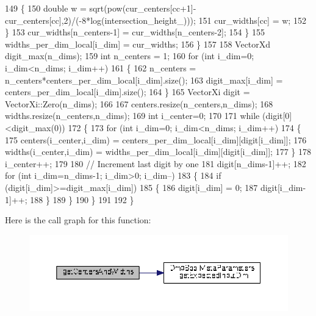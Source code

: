 \begin{DoxyCode}
149       \{
150         \textcolor{keywordtype}{double} w = sqrt(pow(cur\_centers[cc+1]-cur\_centers[cc],2)/(-8*log(intersection\_height\_)));
151         cur\_widths[cc] = w;
152       \}
153       cur\_widths[n\_centers-1] = cur\_widths[n\_centers-2];
154     \}
155     widths\_per\_dim\_local[i\_dim] = cur\_widths;
156   \}
157 
158   VectorXd digit\_max(n\_dims);
159   \textcolor{keywordtype}{int} n\_centers = 1;
160   \textcolor{keywordflow}{for} (\textcolor{keywordtype}{int} i\_dim=0; i\_dim<n\_dims; i\_dim++)
161   \{
162     n\_centers = n\_centers*centers\_per\_dim\_local[i\_dim].size();
163     digit\_max[i\_dim] = centers\_per\_dim\_local[i\_dim].size();
164   \}
165   VectorXi digit = VectorXi::Zero(n\_dims);
166   
167   centers.resize(n\_centers,n\_dims);
168   widths.resize(n\_centers,n\_dims);
169   \textcolor{keywordtype}{int} i\_center=0;
170 
171   \textcolor{keywordflow}{while} (digit[0]<digit\_max(0))
172   \{
173     \textcolor{keywordflow}{for} (\textcolor{keywordtype}{int} i\_dim=0; i\_dim<n\_dims; i\_dim++)
174     \{
175       centers(i\_center,i\_dim) = centers\_per\_dim\_local[i\_dim][digit[i\_dim]];
176       widths(i\_center,i\_dim) = widths\_per\_dim\_local[i\_dim][digit[i\_dim]];
177     \}
178     i\_center++;
179   
180     \textcolor{comment}{// Increment last digit by one}
181     digit[n\_dims-1]++;
182     \textcolor{keywordflow}{for} (\textcolor{keywordtype}{int} i\_dim=n\_dims-1; i\_dim>0; i\_dim--)
183     \{
184       \textcolor{keywordflow}{if} (digit[i\_dim]>=digit\_max[i\_dim])
185       \{
186         digit[i\_dim] = 0;
187         digit[i\_dim-1]++;
188       \}
189     \}
190   \}
191   
192 \}
\end{DoxyCode}


Here is the call graph for this function\+:
\nopagebreak
\begin{figure}[H]
\begin{center}
\leavevmode
\includegraphics[width=350pt]{classDmpBbo_1_1MetaParametersLWR_ab4dfc7a149e6637cb3e610ad827e3477_cgraph}
\end{center}
\end{figure}


